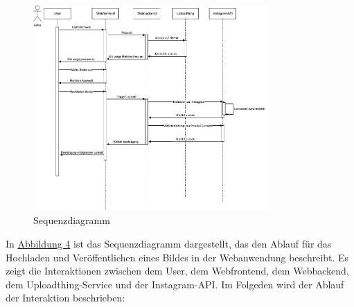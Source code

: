 \begin{figure}[htb]
    \centering
    \includegraphics[width=0.8\textwidth]{graphics/sequence_diagram.png}
    \caption[Sequenzdiagramm]{Sequenzdiagramm\footnotemark}
    \label{fig:fig-4}
\end{figure}

In \hyperref[fig:fig-4]{Abbildung 4} ist das Sequenzdiagramm dargestellt, das den Ablauf für das Hochladen und Veröffentlichen eines Bildes in der Webanwendung beschreibt. Es zeigt die 
Interaktionen zwischen dem User, dem Webfrontend, dem Webbackend, dem Uploadthing-Service und der Instagram-\ac{API}. Im Folgeden wird der Ablauf der Interaktion beschrieben:

